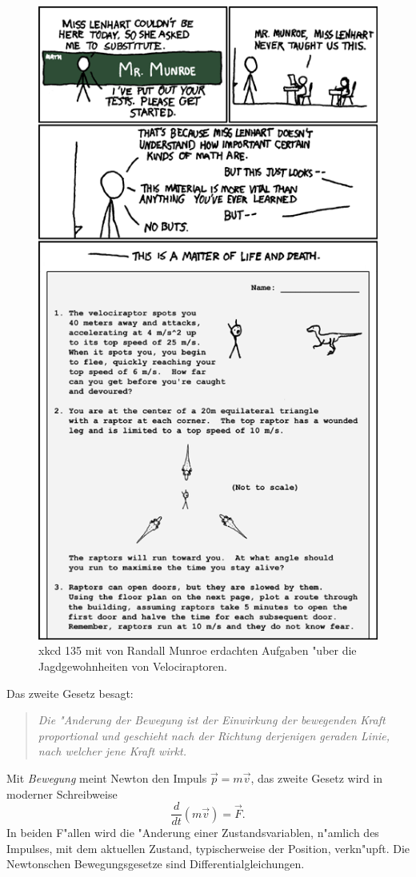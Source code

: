 \begin{figure}
\centering
\includegraphics[width=0.7\hsize]{chapters/substitute.png}
\caption{xkcd 135 mit von Randall Munroe erdachten Aufgaben "uber die
Jagdgewohnheiten von Velociraptoren.
\label{einleitung:xkcd135}}
\end{figure}%


Das zweite Gesetz besagt:
\begin{quote}
\em
Die "Anderung der Bewegung ist der Einwirkung der bewegenden Kraft
proportional und geschieht nach der Richtung derjenigen geraden Linie,
nach welcher jene Kraft wirkt.
\end{quote}
Mit {\em Bewegung}
meint Newton den Impuls $\vec{p}=m\vec{v}$,
%
das zweite Gesetz wird in moderner Schreibweise
\[
\frac{d}{dt}(m\vec{v}) = \vec{F}.
\]
In beiden F"allen wird die "Anderung einer Zustandsvariablen, n"amlich
des Impulses, mit dem aktuellen Zustand, typischerweise der Position,
verkn"upft.
Die Newtonschen Bewegungsgesetze sind Differentialgleichungen.

